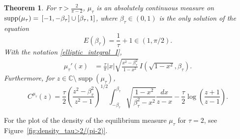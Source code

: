 \documentclass[reqno,11pt]{amsart}
\theoremstyle{plain}
\newtheorem{theorem}{Theorem}[section]
\theoremstyle{definition}
\theoremstyle{remark}
\numberwithin{equation}{section}
\DeclareMathOperator{\supp}{supp}
\newcommand{\C}{\mathbb{C}}
\begin{document}
\begin{theorem}\label{theorem_case_tau>2/(pi-2)}
    For $\tau>\frac{2}{\pi-2}$, $\mu_\tau$ is an absolutely continuous measure on $\supp(\mu_\tau)=\newline\left[-1,-\beta_\tau\right]\cup\left[\beta_\tau,1\right]$, where $\beta_\tau\in (0,1)$ is the only solution of the equation 
    \begin{equation}\label{supp_mu_tau>2/(pi-2)}
       E(\beta_\tau)=   \frac{1}{\tau}+1  \in (1,\pi/2).
    \end{equation}
With the notation \eqref{elliptic_integral_I},
    \begin{equation}\label{mu_tau>2/(pi-2)}
    \begin{split}
         \mu_\tau'(x)&=\frac{\tau}{\pi}|x|\sqrt{\frac{x^2-\beta_\tau^2}{1-x^2}}\, I\left(\sqrt{1-x^2},\beta_\tau \right).
    \end{split}
    \end{equation}
Furthermore, for $z\in \C\setminus\supp(\mu_\tau)$,
\begin{equation}\label{Cauchy_Transform_mu_tau>2/(pi-2)}
        C^{\mu_\tau}(z)=\frac{\tau}{2}\left(\frac{z^2-\beta_\tau^2}{z^2-1}\right)^{1/2}\int_{-\beta_\tau}^{\beta_\tau} \sqrt{\frac{1-x^2}{\beta_\tau^2-x^2}}\frac{dx}{z-x} -\frac{\tau}{2}\log\left(\frac{z+1}{z-1}\right).
    \end{equation}
\end{theorem}
For the plot of the density of the equilibrium measure $\mu_\tau$ for $\tau=2$, see Figure~\ref{fig:density_tau>2/(pi-2)}.
\end{document}
